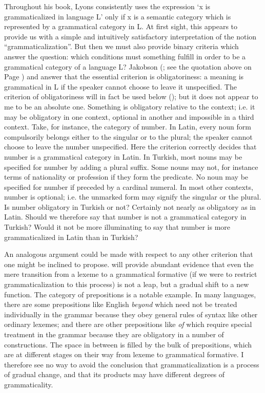 \noindent Throughout his book, Lyons consistently uses the expression ‘x is grammaticalized in language L’ only if x is a semantic category which is represented by a grammatical category in L. At first sight, this appears to provide us with a simple and intuitively satisfactory interpretation of the notion ``grammaticalization''. But then we must also provide binary criteria which answer the question:\label{page14b} which conditions must something fulfill in order to be a grammatical category of a language L? Jakobson (\citeyear[489]{Jakobson1959}; see the quotation above on Page \pageref{quote:Jakobson}) and \citet[84]{Mel'čuk1976} answer that the essential criterion is obligatoriness: a meaning is grammatical in L if the speaker cannot choose to leave it unspecified. The criterion of obligatoriness will in fact be used below (); but it does not appear to me to be an absolute one. Something is obligatory relative to the context; i.e. it may be obligatory in one context, optional in another and impossible in a third context.\label{page14} Take, for instance, the category of number. In Latin, every noun form compulsorily belongs either to the singular or to the plural; the speaker cannot choose to leave the number unspecified. Here the criterion correctly decides that number is a grammatical category in Latin. In Turkish, most nouns may be specified for number by adding a plural suffix. Some nouns may not, for instance terms of nationality or profession if they form the predicate. No noun may be specified for number if preceded by a cardinal numeral. In most other contexts, number is optional; i.e. the unmarked form may signify the singular or the plural. Is number obligatory in Turkish or not? Certainly not nearly as obligatory as in Latin. Should we therefore say that number is not a grammatical category in Turkish? Would it not be more illuminating to say that number is more grammaticalized in Latin than in Turkish?

An analogous argument could be made with respect to any other criterion that one might be inclined to propose.  will provide abundant evidence that even the mere transition from a lexeme to a grammatical formative (if we were to restrict grammaticalization to this process) is not a leap, but a gradual shift to a new function. The category of prepositions is a notable example. In many languages, there are some prepositions like English \textit{beyond} which need not be treated individually in the grammar because they obey general rules of syntax like other ordinary lexemes; and there are other prepositions like \textit{of} which require special treatment in the grammar because they are obligatory in a number of constructions. The space in between is filled by the bulk of prepositions, which are at different stages on their way from lexeme to grammatical formative. I therefore see no way to avoid the conclusion that grammaticalization is a process of gradual change, and that its products may have different degrees of grammaticality.

